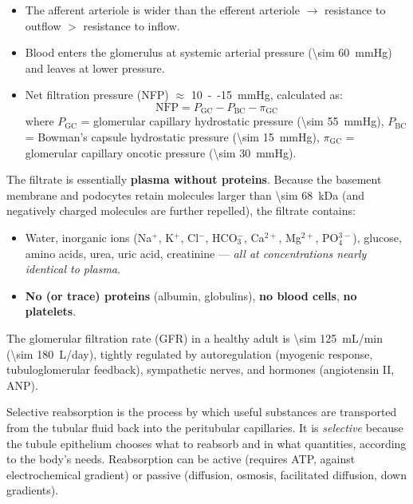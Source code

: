 \documentclass[11pt]{article}
\newcommand{\cle}[1]{{\popxbold\color{popdark}#1}}
\newcounter{popsec}
\newcounter{popsub}
\newcommand{\courssub}[1]{%
  \stepcounter{popsub}%
  \par\vspace{9pt}\noindent{\popxbold\fontsize{11.5}{13}\selectfont\color{popink}{\color{poporange}\thepopsec.\thepopsub}\hspace{6pt}#1}\par\nopagebreak\vspace{4pt}
}
\begin{document}
\begin{aretenir}
\begin{itemize}
\item The \cle{afferent arteriole} is wider than the \cle{efferent arteriole} $\to$ resistance to outflow $>$ resistance to inflow.
\item Blood enters the glomerulus at systemic arterial pressure (\SI{\sim 60}{mmHg}) and leaves at lower pressure.
\item Net filtration pressure (NFP) $\approx$ \SI{10}{--}\SI{15}{mmHg}, calculated as:
\[
\text{NFP} = P_{\text{GC}} - P_{\text{BC}} - \pi_{\text{GC}}
\]
where $P_{\text{GC}}$ = glomerular capillary hydrostatic pressure (\SI{\sim 55}{mmHg}), $P_{\text{BC}}$ = Bowman's capsule hydrostatic pressure (\SI{\sim 15}{mmHg}), $\pi_{\text{GC}}$ = glomerular capillary oncotic pressure (\SI{\sim 30}{mmHg}).
\end{itemize}
\end{aretenir}

\begin{propriete}
The filtrate is essentially \textbf{plasma without proteins}. Because the basement membrane and podocytes retain molecules larger than \SI{\sim 68}{kDa} (and negatively charged molecules are further repelled), the filtrate contains:
\begin{itemize}
\item Water, inorganic ions (Na$^+$, K$^+$, Cl$^-$, HCO$_3^-$, Ca$^{2+}$, Mg$^{2+}$, PO$_4^{3-}$), glucose, amino acids, urea, uric acid, creatinine — \emph{all at concentrations nearly identical to plasma}.
\item \textbf{No (or trace) proteins} (albumin, globulins), \textbf{no blood cells}, \textbf{no platelets}.
\end{itemize}
The \cle{glomerular filtration rate (GFR)} in a healthy adult is \SI{\sim 125}{mL/min} (\SI{\sim 180}{L/day}), tightly regulated by autoregulation (myogenic response, tubuloglomerular feedback), sympathetic nerves, and hormones (angiotensin II, ANP).
\end{propriete}

\courssub{Stage 2: Selective Reabsorption}

\begin{definition}
Selective reabsorption is the process by which useful substances are transported from the tubular fluid back into the peritubular capillaries. It is \emph{selective} because the tubule epithelium chooses what to reabsorb and in what quantities, according to the body's needs. Reabsorption can be \cle{active} (requires ATP, against electrochemical gradient) or \cle{passive} (diffusion, osmosis, facilitated diffusion, down gradients).
\end{definition}
\end{document}
